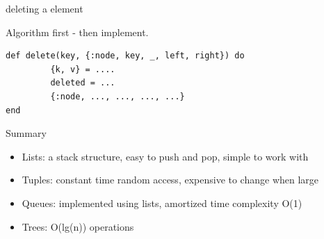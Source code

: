 \begin{frame}[fragile]{deleting a element}

\pause Algorithm first - then implement.

\pause
\begin{verbatim}
def delete(key, {:node, key, _, left, right}) do 
         {k, v} = ....
         deleted = ...
         {:node, ..., ..., ..., ...}
end
\end{verbatim}

\end{frame}



\begin{frame}{Summary}

\begin{itemize}
\item Lists: a stack structure, easy to push and pop, simple to work with 
\item Tuples: constant time random access, expensive to change when large
\item Queues: implemented using lists, amortized time complexity O(1)
\item Trees: O(lg(n)) operations
\end{itemize}


\end{frame}





